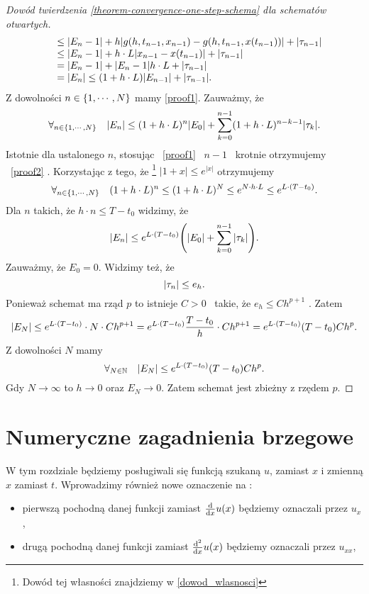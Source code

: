 \documentclass[12pt,a4paper]{report}
\begin{document}
\begin{proof}[Dowód twierdzenia \ref{theorem-convergence-one-step-schema} dla schematów otwartych]
\begin{equation}
\begin{array}{rl}
&\leq \abs{E_n-1} + h \abs{g(h,t_{n-1},x_{n-1}) - g(h,t_{n-1},x(t_{n-1}))} + \abs{ \tau_{n-1}}\\
&\leq \abs{E_n-1} + h \cdot L \abs{x_{n-1} - x(t_{n-1})} + \abs{ \tau_{n-1}}\\
&= \abs{E_n-1} + \abs{E_n-1} h \cdot L + \abs{ \tau_{n-1}}\\
&= \abs{E_n} \leq (1 + h \cdot L) \abs{E_{n-1}} + \abs{\tau_{n-1}} .
\end{array}
\end{equation}
Z dowolności $n \in \set{1, \cdots, N}$ mamy \eqref{proof1}. 
Zauważmy, że 
\begin{equation} \label{proof2}
\forall_{n \in \set{1,\cdots,N}} \quad \abs{E_n} \leq (1 + h \cdot L)^{n} \abs{E_0} + \sum_{k=0}^{n-1} (1+ h \cdot L)^{n-k-1} \abs{\tau_k}. 
\end{equation}
Istotnie dla ustalonego $n$, stosując \  \eqref{proof1} \  $n-1$ \  krotnie otrzymujemy \ \eqref{proof2} . Korzystając z tego, że \footnote{Dowód tej własności znajdziemy w \ref{dowod_wlasnosci}} $|1+x|\leqslant e^{|x|}$ otrzymujemy
$$
\forall_{n \in \set{1,\cdots,N}} \quad (1 + h \cdot L)^{n} \leq (1 + h \cdot L)^{N} \leq e^{N \cdot h \cdot L} \leq e^{L \cdot (T-t_0)} .
$$
Dla $n$ takich, że $h\cdot n\leq  T - t_0 $ widzimy, że
$$
\abs{E_n} \leq e^{L \cdot (T-t_0)} \bracket{\abs{E_0} + \sum_{k=0}^{n-1}\abs{\tau_k}}.
$$
Zauważmy, że $E_0 = 0$. Widzimy też, że 
$$
\abs{\tau_n} \leq e_h.
$$
Ponieważ schemat ma rząd $p$ to istnieje  $C>0$ \ takie, że $e_h \leq Ch^{p+1} $ . Zatem
$$
\abs{E_N} \leq  e^{L \cdot (T-t_0)} \cdot N \cdot Ch^{p+1}
= e^{L \cdot (T-t_0)} \frac{T-t_0}{h} \cdot Ch^{p+1}
= e^{L \cdot (T-t_0)} (T-t_0) Ch^p.
$$
Z dowolności $N$ mamy
$$
\forall_{N \in \setN} \quad \abs{E_N} \leq e^{L \cdot (T-t_0)} (T-t_0) Ch^p.
$$
Gdy $ N \to \infty $ to $ h \to 0 $ oraz $ E_N \to 0$. Zatem schemat jest zbieżny z rzędem $p$.
\end{proof}
\chapter{Numeryczne zagadnienia brzegowe}
W tym rozdziale będziemy posługiwali się funkcją szukaną $u$, zamiast $x$ i zmienną $x$ zamiast $t$. Wprowadzimy również nowe oznaczenie na :
\begin{itemize}
\item pierwszą pochodną danej funkcji zamiast $\ddx{x} u(x) $ będziemy oznaczali przez $u_{x}$,
\item drugą pochodną danej funkcji zamiast $\ddx[^2]{x} u(x)$ będziemy oznaczali przez $u_{xx}$,
\end{itemize}
\end{document}
